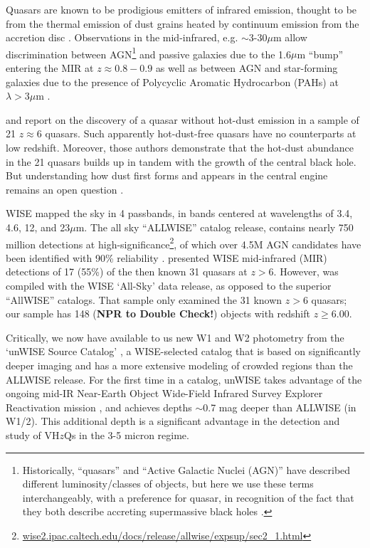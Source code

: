 \documentclass[usenatbib]{mnras}
\begin{document}
Quasars are known to be prodigious emitters of infrared emission,
thought to be from the thermal emission of dust grains heated by
continuum emission from the accretion disc
\citep[e.g.,][]{Richards2006b, Leipski2014, Hill2014, Hickox2017}.
Observations in the mid-infrared, e.g. $\sim$3-30$\mu$m allow
discrimination between AGN\footnote{Historically, ``quasars'' and
``Active Galactic Nuclei (AGN)'' have described different
luminosity/classes of objects, but here we use these terms
interchangeably, with a preference for quasar, in recognition of the
fact that they both describe accreting supermassive black holes
\citep[e.g.][]{Haardt2016book}.}  and passive galaxies due to the
1.6$\mu$m ``bump'' entering the MIR at $z\approx0.8-0.9$ \citep[e.g.,
][]{Wright1994, Sawicki2002, Lacy2004, Stern2005, Richards2006b,
Timlin2016} as well as between AGN and star-forming galaxies due to
the presence of Polycyclic Aromatic Hydrocarbon (PAHs) at $\lambda
>3\mu$m \citep[e.g., ][]{Yan2007, Tielens2008}.

\citet{Jiang2006dust} and \citet{Jiang2010} report on the discovery of
a quasar without hot-dust emission in a sample of 21 $z\approx6$
quasars. Such apparently hot-dust-free quasars have no counterparts at
low redshift. Moreover, those authors demonstrate that the hot-dust
abundance in the 21 quasars builds up in tandem with the growth of the
central black hole. But understanding how dust first forms and appears
in the central engine remains an open question \citep{WangR2008, WangR2011}. 

WISE mapped the sky in 4 passbands, in bands centered at wavelengths
of 3.4, 4.6, 12, and 23$\mu$m. The all sky ``ALLWISE'' catalog
release, contains nearly 750 million detections at
high-significance\footnote{\href{wise2.ipac.caltech.edu/docs/release/allwise/expsup/sec2\_1.html}{wise2.ipac.caltech.edu/docs/release/allwise/expsup/sec2\_1.html}},
of which over 4.5M AGN candidates have been identified with 90\%
reliability \citep{Assef2018}.  \citet{Blain2013} presented WISE
mid-infrared (MIR) detections of 17 (55\%) of the then known 31
quasars at $z > 6$. However, \citet{Blain2013} was compiled with the
WISE `All-Sky' data release, as opposed to the superior ``AllWISE''
catalogs. That sample only examined the 31 known $z>6$ quasars; our
sample has 148 ({\bf NPR to Double Check!}) objects with redshift $z
\geq 6.00$.

Critically, we now have available to us new W1 and W2 photometry from
the `unWISE Source Catalog' \citep[][]{Schlafly_Meisner2018}, a
WISE-selected catalog that is based on significantly deeper imaging
and has a more extensive modeling of crowded regions than the ALLWISE
release. For the first time in a catalog, unWISE takes advantage of
the ongoing mid-IR Near-Earth Object Wide-Field Infrared Survey
Explorer Reactivation mission \citep[NEOWISE-R; ][]{Mainzer2014}, and
achieves depths $\sim$0.7 mag deeper than ALLWISE (in W1/2).  This
additional depth is a significant advantage in the detection and study
of VH$z$Qs in the 3-5 micron regime.
\end{document}

